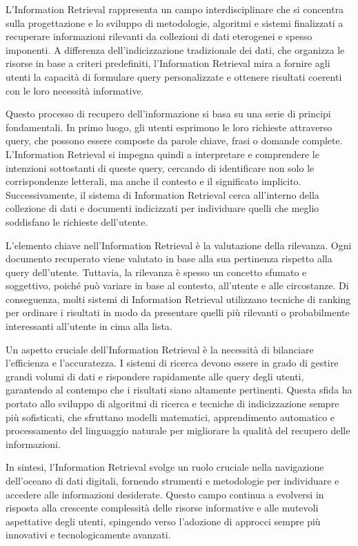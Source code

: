 L'Information Retrieval rappresenta un campo interdisciplinare che si concentra sulla progettazione e lo sviluppo di metodologie, algoritmi e sistemi finalizzati a recuperare informazioni rilevanti da collezioni di dati eterogenei e spesso imponenti. A differenza dell'indicizzazione tradizionale dei dati, che organizza le risorse in base a criteri predefiniti, l'Information Retrieval mira a fornire agli utenti la capacità di formulare query personalizzate e ottenere risultati coerenti con le loro necessità informative.

Questo processo di recupero dell'informazione si basa su una serie di principi fondamentali. In primo luogo, gli utenti esprimono le loro richieste attraverso query, che possono essere composte da parole chiave, frasi o domande complete. L'Information Retrieval si impegna quindi a interpretare e comprendere le intenzioni sottostanti di queste query, cercando di identificare non solo le corrispondenze letterali, ma anche il contesto e il significato implicito. Successivamente, il sistema di Information Retrieval cerca all'interno della collezione di dati e documenti indicizzati per individuare quelli che meglio soddisfano le richieste dell'utente.

L'elemento chiave nell'Information Retrieval è la valutazione della rilevanza. Ogni documento recuperato viene valutato in base alla sua pertinenza rispetto alla query dell'utente. Tuttavia, la rilevanza è spesso un concetto sfumato e soggettivo, poiché può variare in base al contesto, all'utente e alle circostanze. Di conseguenza, molti sistemi di Information Retrieval utilizzano tecniche di ranking per ordinare i risultati in modo da presentare quelli più rilevanti o probabilmente interessanti all'utente in cima alla lista.

Un aspetto cruciale dell'Information Retrieval è la necessità di bilanciare l'efficienza e l'accuratezza. I sistemi di ricerca devono essere in grado di gestire grandi volumi di dati e rispondere rapidamente alle query degli utenti, garantendo al contempo che i risultati siano altamente pertinenti. Questa sfida ha portato allo sviluppo di algoritmi di ricerca e tecniche di indicizzazione sempre più sofisticati, che sfruttano modelli matematici, apprendimento automatico e processamento del linguaggio naturale per migliorare la qualità del recupero delle informazioni.

In sintesi, l'Information Retrieval svolge un ruolo cruciale nella navigazione dell'oceano di dati digitali, fornendo strumenti e metodologie per individuare e accedere alle informazioni desiderate. Questo campo continua a evolversi in risposta alla crescente complessità delle risorse informative e alle mutevoli aspettative degli utenti, spingendo verso l'adozione di approcci sempre più innovativi e tecnologicamente avanzati.